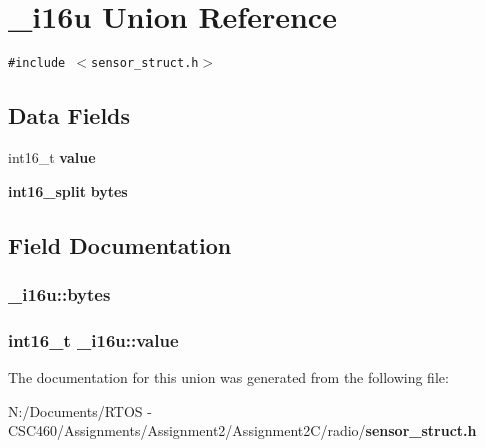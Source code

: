 \section{\_\-i16u Union Reference}
\label{union__i16u}
{\tt \#include $<$sensor\_\-struct.h$>$}

\subsection*{Data Fields}
\begin{CompactItemize}
\item 
int16\_\-t {\bf value}
\item 
{\bf int16\_\-split} {\bf bytes}
\end{CompactItemize}


\subsection{Field Documentation}
\subsubsection{ {\bf \_\-i16u::bytes}}\label{union__i16u_c90c7e5ab0193229e169d15edd3b1a13}


\subsubsection{\setlength{\rightskip}{0pt plus 5cm}int16\_\-t {\bf \_\-i16u::value}}\label{union__i16u_ccfd2059f77b7e88ab89be79812b92c6}




The documentation for this union was generated from the following file:\begin{CompactItemize}
\item 
N:/Documents/RTOS - CSC460/Assignments/Assignment2/Assignment2C/radio/{\bf sensor\_\-struct.h}\end{CompactItemize}
